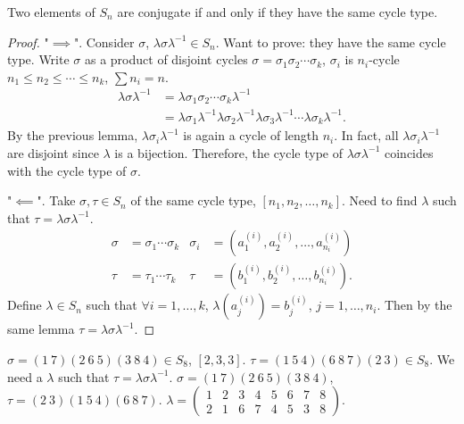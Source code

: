 \documentclass[10pt, a4paper]{article}
\begin{document}
\begin{proposition}
    Two elements of $S_n$ are conjugate if and only if they have the same cycle type.

    \begin{proof}
        "$\implies$".
        Consider $\sigma$,
        $\lambda\sigma\lambda ^ {-1} \in S_n$.
        Want to prove:
        they have the same cycle type.
        Write $\sigma$ as a product of disjoint cycles
        $\sigma = \sigma_1\sigma_2\dotsi\sigma_k$,
        $\sigma_i$ is $n_i$-cycle $n_1 \leq n_2 \leq \dotsi \leq n_k$,
        $\sum n_i = n$.
        \begin{align*}
            \lambda \sigma\lambda ^ {-1} &= \lambda\sigma_1\sigma_2\dotsi\sigma_k\lambda ^ {-1} \\
            &= \lambda\sigma_1\lambda ^ {-1}\lambda\sigma_2\lambda ^ {-1}\lambda\sigma_3\lambda ^ {-1}\dotsi \lambda\sigma_k\lambda ^ {-1}.
        \end{align*}
        By the previous lemma,
        $\lambda\sigma_i\lambda ^ {-1}$ is again a cycle of length $n_i$.
        In fact,
        all $\lambda\sigma_i\lambda ^ {-1}$ are disjoint since $\lambda$ is a bijection.
        Therefore,
        the cycle type of $\lambda\sigma\lambda ^ {-1}$ coincides with the cycle type of $\sigma$.

        "$\impliedby$".
        Take $\sigma, \tau \in S_n$ of the same cycle type,
        $[n_1, n_2, \dotsc, n_k]$.
        Need to find $\lambda$ such that $\tau = \lambda\sigma\lambda ^ {-1}$.
        \begin{align*}
            \sigma &= \sigma_1 \dotsi \sigma_k & \sigma_i &= (a_1 ^ {(i)}, a_2 ^ {(i)}, \dotsc, a_{n_i} ^ {(i)}) \\
            \tau &= \tau_1 \dotsi \tau_k & \tau &= (b_1 ^ {(i)}, b_2 ^ {(i)}, \dotsc, b_{n_i} ^ {(i)}).
        \end{align*}
        Define $\lambda \in S_n$ such that $\forall i = 1, \dotsc, k$,
        $\lambda\left(a_j ^ {(i)}\right) = b_j ^ {(i)}$,
        $j = 1, \dotsc, n_i$.
        Then by the same lemma $\tau = \lambda\sigma\lambda ^ {-1}$.
    \end{proof}
\end{proposition}

\begin{example}
    $\sigma = (1\ 7)(2\ 6\ 5)(3\ 8\ 4) \in S_8$,
    $[2, 3, 3]$.
    $\tau = (1\ 5\ 4)(6\ 8\ 7)(2\ 3) \in S_8$.
    We need a $\lambda$ such that $\tau = \lambda\sigma\lambda ^ {-1}$.
    $\sigma = (1\ 7)(2\ 6\ 5)(3\ 8\ 4)$,
    $\tau = (2\ 3)(1\ 5\ 4)(6\ 8\ 7)$.
    $\lambda = \begin{pmatrix}
        1 & 2 & 3 & 4 & 5 & 6 & 7 & 8 \\
        2 & 1 & 6 & 7 & 4 & 5 & 3 & 8
    \end{pmatrix}$.
\end{example}
\end{document}
